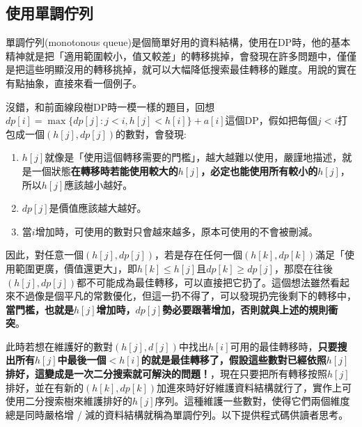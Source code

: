 \subsection{使用單調佇列}
單調佇列(monotonous queue)是個簡單好用的資料結構，使用在DP時，他的基本精神就是把「適用範圍較小，值又較差」的轉移挑掉，會發現在許多問題中，僅僅是把這些明顯沒用的轉移挑掉，就可以大幅降低搜索最佳轉移的難度。用說的實在有點抽象，直接來看一個例子。


沒錯，和前面線段樹DP時一模一樣的題目，回想$dp[i] = \max\{dp[j] : j < i, h[j] < h[i]\} + a[i]$這個DP，假如把每個$j < i$打包成一個$(h[j], dp[j])$的數對，會發現:
\begin{enumerate}
\item $h[j]$就像是「使用這個轉移需要的門檻」，越大越難以使用，嚴謹地描述，就是一個狀態\textbf{在轉移時若能使用較大的$h[j]$，必定也能使用所有較小的$h[j]$}，所以$h[j]$應該越小越好。
\item $dp[j]$是價值應該越大越好。
\item 當$i$增加時，可使用的數對只會越來越多，原本可使用的不會被刪減。
\end{enumerate}

因此，對任意一個$(h[j], dp[j])$，若是存在任何一個$(h[k], dp[k])$滿足「使用範圍更廣，價值還更大」，即$h[k] \leq h[j]$且$dp[k] \geq dp[j]$，那麼在往後$(h[j], dp[j])$都不可能成為最佳轉移，可以直接把它扔了。這個想法雖然看起來不過像是個平凡的常數優化，但這一扔不得了，可以發現扔完後剩下的轉移中，\textbf{當門檻，也就是$h[j]$增加時，$dp[j]$勢必要跟著增加，否則就與上述的規則衝突}。

此時若想在維護好的數對$(h[j], d[j])$中找出$h[i]$可用的最佳轉移時，\textbf{只要搜出所有$h[j]$中最後一個$< h[i]$的就是最佳轉移了，假設這些數對已經依照$h[j]$排好，這變成是一次二分搜索就可解決的問題！}，現在只要把所有轉移按照$h[j]$排好，並在有新的$(h[k], dp[k])$加進來時好好維護資料結構就行了，實作上可使用二分搜索樹來維護排好的$h[j]$序列。這種維護一些數對，使得它們兩個維度總是同時嚴格增 / 減的資料結構就稱為單調佇列。以下提供程式碼供讀者思考。

